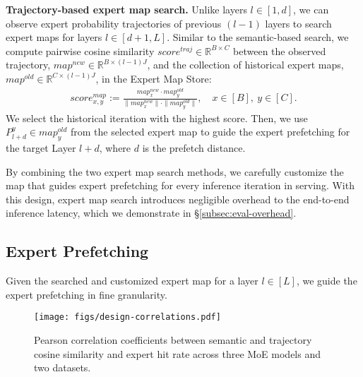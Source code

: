 \textbf{Trajectory-based expert map search.}
Unlike layers $l \in [1, d]$, we can observe expert probability trajectories of previous $(l-1)$ layers to search expert maps for layers $l \in [d+1, L]$.
Similar to the semantic-based search, we compute pairwise cosine similarity $\textit{score}^{\textit{traj}} \in \mathbb{R}^{B \times C}$ between the observed trajectory, $\textit{map}^{\textit{new}} \in \mathbb{R}^{B \times (l-1)J}$, and the collection of historical expert maps, $\textit{map}^{\textit{old}} \in \mathbb{R}^{C \times (l-1)J}$, in the Expert Map Store: 
%
\begin{align}
    \textit{score}^{\textit{map}}_{x,y} := \frac{\textit{map}^{\textit{new}}_x \cdot map^{\textit{old}}_y}{\|\textit{map}^{\textit{new}}_x\| \cdot \|\textit{map}^{\textit{old}}_y\|}, \quad x \in [B], ~y \in [C].
    \label{eq:score-map}
\end{align}
%
We select the historical iteration with the highest score. Then, we use $P^y_{l+d} \in \textit{map}^{\textit{old}}_y$ from the selected expert map to guide the expert prefetching for the target Layer $l+d$, where $d$ is the prefetch distance.


By combining the two expert map search methods, we carefully customize the map that guides expert prefetching for every inference iteration in \MoE serving.
%
With this design, expert map search introduces negligible overhead to the end-to-end inference latency, which we demonstrate in \S\ref{subsec:eval-overhead}.


\subsection{Expert Prefetching}
\label{subsec:design-expert-prefetch}


Given the searched and customized expert map for a layer $l \in [L]$, we guide the expert prefetching in fine granularity.

\begin{figure}[t]
  \centering
  \texttt{[image: figs/design-correlations.pdf]}
  \vspace{-0.1in}
  \caption{Pearson correlation coefficients between semantic and trajectory cosine similarity and expert hit rate across three MoE models and two datasets.}
  \vspace{-0.1in}
  \label{fig:design-correlations}
\end{figure}


